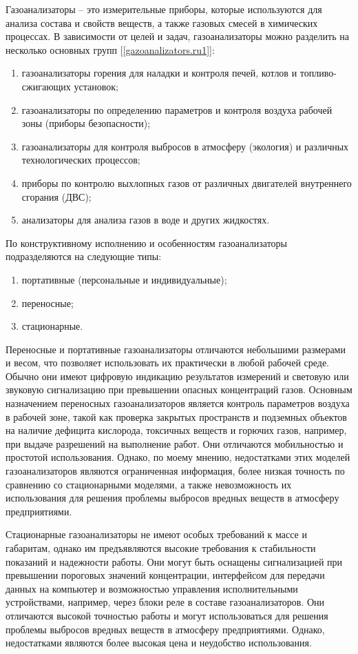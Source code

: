 \documentclass[14pt, a4paper]{extreport}
\begin{document}
	Газоанализаторы -- это измерительные приборы, которые используются для анализа состава и свойств веществ, а также газовых смесей в химических процессах. В зависимости от целей и задач, газоанализаторы можно разделить на несколько основных групп [\ref{gazoanalizators.ru1}]:
	\begin{enumerate}[label={\arabic*)}]
		\item газоанализаторы горения для наладки и контроля печей, котлов и топливо-сжигающих установок;
		\item газоанализаторы по определению параметров и контроля воздуха рабочей зоны (приборы безопасности);
		\item газоанализаторы для контроля выбросов в атмосферу (экология) и различных технологических процессов;
		\item приборы по контролю выхлопных газов от различных двигателей внутреннего сгорания (ДВС);
		\item анализаторы для анализа газов в воде и других жидкостях.
	\end{enumerate}	
	
	По конструктивному исполнению и особенностям газоанализаторы подразделяются на следующие типы:
	\begin{enumerate}[label={\arabic*)}]
		\item портативные (персональные и индивидуальные);
		\item переносные;
		\item стационарные.
	\end{enumerate}	
	
	Переносные и портативные газоанализаторы отличаются небольшими размерами и весом, что позволяет использовать их практически в любой рабочей среде. Обычно они имеют цифровую индикацию результатов измерений и световую или звуковую сигнализацию при превышении опасных концентраций газов. Основным назначением переносных газоанализаторов является контроль параметров воздуха в рабочей зоне, такой как проверка закрытых пространств и подземных объектов на наличие дефицита кислорода, токсичных веществ и горючих газов, например, при выдаче разрешений на выполнение работ. Они отличаются мобильностью и простотой использования. Однако, по моему мнению, недостатками этих моделей газоанализаторов являются ограниченная информация, более низкая точность по сравнению со стационарными моделями, а также невозможность их использования для решения проблемы выбросов вредных веществ в атмосферу предприятиями.
	
	Стационарные газоанализаторы не имеют особых требований к массе и габаритам, однако им предъявляются высокие требования к стабильности показаний и надежности работы. Они могут быть оснащены сигнализацией при превышении пороговых значений концентрации, интерфейсом для передачи данных на компьютер и возможностью управления исполнительными устройствами, например, через блоки реле в составе газоанализаторов. Они отличаются высокой точностью работы и могут использоваться для решения проблемы выбросов вредных веществ в атмосферу предприятиями. Однако, недостатками являются более высокая цена и неудобство использования.
	
\end{document}
